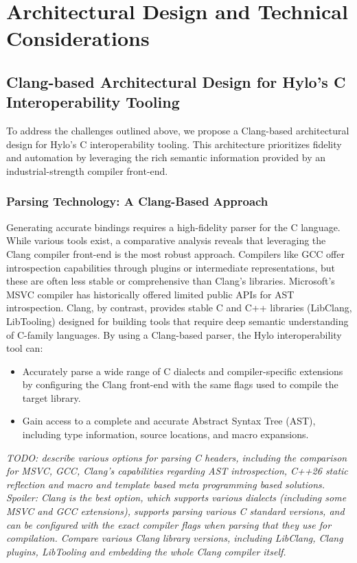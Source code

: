 \section{Architectural Design and Technical Considerations}
\label{sec:architectural_design}


\subsection{Clang-based Architectural Design for Hylo's C Interoperability Tooling}

To address the challenges outlined above, we propose a Clang-based architectural design for Hylo's C interoperability tooling. This architecture prioritizes fidelity and automation by leveraging the rich semantic information provided by an industrial-strength compiler front-end.

\subsubsection{Parsing Technology: A Clang-Based Approach}

Generating accurate bindings requires a high-fidelity parser for the C language. While various tools exist, a comparative analysis reveals that leveraging the Clang compiler front-end is the most robust approach. Compilers like GCC offer introspection capabilities through plugins or intermediate representations, but these are often less stable or comprehensive than Clang's libraries. Microsoft's MSVC compiler has historically offered limited public APIs for AST introspection.
Clang, by contrast, provides stable C and C++ libraries (LibClang, LibTooling) designed for building tools that require deep semantic understanding of C-family languages. By using a Clang-based parser, the Hylo interoperability tool can:

\begin{itemize}
    \item Accurately parse a wide range of C dialects and compiler-specific extensions by configuring the Clang front-end with the same flags used to compile the target library.
    \item Gain access to a complete and accurate Abstract Syntax Tree (AST), including type information, source locations, and macro expansions.
\end{itemize}

\textit{TODO: describe various options for parsing C headers, including the comparison for MSVC, GCC, Clang's capabilities regarding AST introspection, C++26 static reflection and macro and template based meta programming based solutions. Spoiler: Clang is the best option, which supports various dialects (including some MSVC and GCC extensions), supports parsing various C standard versions, and can be configured with the exact compiler flags when parsing that they use for compilation. Compare various Clang library versions, including LibClang, Clang plugins, LibTooling and embedding the whole Clang compiler itself.
}

